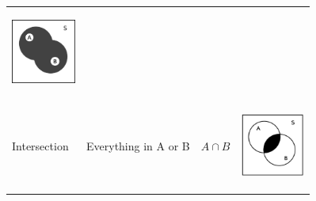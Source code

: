 \begin{center}
\begin{xtabular*}{\mytablewidth}[t]{|p{10\mystarwidth}|p{10\mystarwidth}|p{10\mystarwidth}|p{10\mystarwidth}|}
    \begin{center}
    \label{m39373*uid14547!!!underscore!!!media}\label{m39373*uid14547!!!underscore!!!printimage}\includegraphics[width=80px]{col11306.imgs/m39373_union.png} %
      \vspace{2pt}
    \vspace{.1in}
    \end{center}    %
     \tabularnewline{}
        Intersection &
        Everything in A or B &
        $A\cap B$ &
    \setcounter{subfigure}{0}
\label{m39373*uid14587}
    \begin{center}
    \label{m39373*uid14587!!!underscore!!!media}\label{m39373*uid14587!!!underscore!!!printimage}\includegraphics[width=80px]{col11306.imgs/m39373_intersect.png} %
      \vspace{2pt}
    \vspace{.1in}
    \end{center}    %
     \tabularnewline{}

\end{xtabular*}
\end{center}
